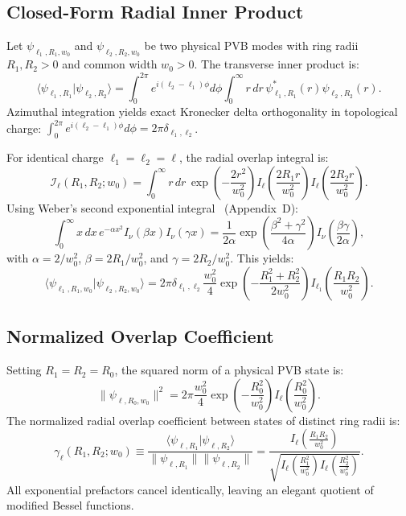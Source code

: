 \documentclass{optica-article}
\begin{document}
\subsection{Closed-Form Radial Inner Product}

Let $\psi_{\ell_1, R_1, w_0}$ and $\psi_{\ell_2, R_2, w_0}$ be two physical PVB modes with ring radii $R_1, R_2 > 0$ and common width $w_0 > 0$. The transverse inner product is:
\begin{equation}
\langle \psi_{\ell_1, R_1} | \psi_{\ell_2, R_2} \rangle = \int_0^{2\pi} e^{i(\ell_2 - \ell_1)\phi} d\phi \int_0^\infty r \, dr \, \psi_{\ell_1, R_1}^*(r) \psi_{\ell_2, R_2}(r).
\end{equation}
Azimuthal integration yields exact Kronecker delta orthogonality in topological charge: $\int_0^{2\pi} e^{i(\ell_2 - \ell_1)\phi} d\phi = 2\pi \delta_{\ell_1, \ell_2}$.

For identical charge $\ell_1 = \ell_2 = \ell$, the radial overlap integral is:
\begin{equation}
\mathcal{I}_\ell(R_1, R_2; w_0) = \int_0^\infty r \, dr \, \exp\left(-\frac{2 r^2}{w_0^2}\right) I_\ell\left(\frac{2 R_1 r}{w_0^2}\right) I_\ell\left(\frac{2 R_2 r}{w_0^2}\right).
\end{equation}
Using Weber's second exponential integral~\cite{Gradshteyn2014} (Appendix~D):
\begin{equation}
\int_0^\infty x \, dx \, e^{-\alpha x^2} I_\nu(\beta x) I_\nu(\gamma x) = \frac{1}{2\alpha} \exp\left(\frac{\beta^2 + \gamma^2}{4\alpha}\right) I_\nu\left(\frac{\beta \gamma}{2\alpha}\right),
\end{equation}
with $\alpha = 2/w_0^2$, $\beta = 2 R_1 / w_0^2$, and $\gamma = 2 R_2 / w_0^2$. This yields:
\begin{equation}
\boxed{\langle \psi_{\ell_1, R_1, w_0} | \psi_{\ell_2, R_2, w_0} \rangle = 2\pi \delta_{\ell_1, \ell_2} \frac{w_0^2}{4} \exp\left(-\frac{R_1^2 + R_2^2}{2 w_0^2}\right) I_{\ell_1}\left(\frac{R_1 R_2}{w_0^2}\right).}
\label{eq:exact_inner_product}
\end{equation}

\subsection{Normalized Overlap Coefficient}

Setting $R_1 = R_2 = R_0$, the squared norm of a physical PVB state is:
\begin{equation}
\|\psi_{\ell, R_0, w_0}\|^2 = 2\pi \frac{w_0^2}{4} \exp\left(-\frac{R_0^2}{w_0^2}\right) I_\ell\left(\frac{R_0^2}{w_0^2}\right).
\end{equation}
The normalized radial overlap coefficient between states of distinct ring radii is:
\begin{equation}
\gamma_\ell(R_1, R_2; w_0) \equiv \frac{\langle \psi_{\ell, R_1} | \psi_{\ell, R_2} \rangle}{\|\psi_{\ell, R_1}\| \|\psi_{\ell, R_2}\|} = \frac{I_\ell\left(\frac{R_1 R_2}{w_0^2}\right)}{\sqrt{I_\ell\left(\frac{R_1^2}{w_0^2}\right) I_\ell\left(\frac{R_2^2}{w_0^2}\right)}}.
\label{eq:normalized_overlap}
\end{equation}
All exponential prefactors cancel identically, leaving an elegant quotient of modified Bessel functions.
\end{document}
